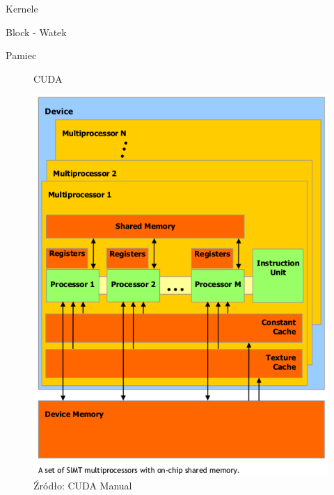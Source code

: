 Kernele

Block - Watek

Pamiec


\begin{figure}[ht]
\centering

\caption{CUDA}
\label{cuda-model}
\end{figure}


\begin{figure}[ht]
\centering
\includegraphics[scale=0.8]{images/gpu.png}
\caption{Źródło: CUDA Manual}
\end{figure}
